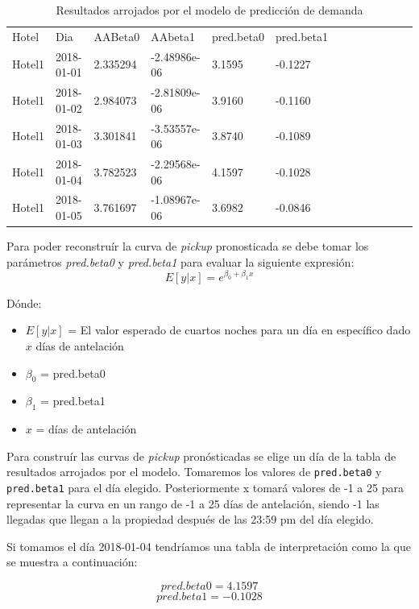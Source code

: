 \begin{table}[H]
\begin{tabular}{lllllllllllll}
Hotel  & Dia         & AABeta0  & AAbeta1      & pred.beta0 & pred.beta1  \\
Hotel1 & 2018-01-01  & 2.335294 & -2.48986e-06 & 3.1595     & -0.1227     \\
Hotel1 & 2018-01-02  & 2.984073 & -2.81809e-06 & 3.9160     & -0.1160     \\
Hotel1 & 2018-01-03  & 3.301841 & -3.53557e-06 & 3.8740     & -0.1089     \\
Hotel1 & 2018-01-04  & 3.782523 & -2.29568e-06 & 4.1597     & -0.1028     \\
Hotel1 & 2018-01-05 & 3.761697 & -1.08967e-06 & 3.6982     & -0.0846    
\end{tabular}
\caption{Resultados arrojados por el modelo de predicción de demanda} 
\end{table}

Para poder reconstruír la curva de \emph{pickup} pronosticada se debe tomar los parámetros \emph{pred.beta0} y \emph{pred.beta1} para evaluar la siguiente expresión: $$E[y|x]=e^{\beta_0 + \beta_1x}$$

Dónde:
\begin{itemize}[noitemsep]
\item $E[y|x]$ = El valor esperado de cuartos noches para un día en específico dado $x$ días de antelación
\item $\beta_0$ = pred.beta0
\item $\beta_1$ = pred.beta1
\item $x$ = días de antelación
\end{itemize}

Para construír las curvas de \emph{pickup} pronósticadas se elige un día de la tabla de resultados arrojados por el modelo. Tomaremos los valores de \texttt{pred.beta0} y \texttt{pred.beta1} para el día elegido. Posteriormente x tomará valores de -1 a 25 para representar la curva en un rango de -1 a 25 días de antelación, siendo -1 las llegadas que llegan a la propiedad después de las 23:59 pm del día elegido.

Si tomamos el día 2018-01-04 tendríamos una tabla de interpretación como la que se muestra a continuación:

$$pred.beta0 = 4.1597$$ $$pred.beta1 = -0.1028$$

